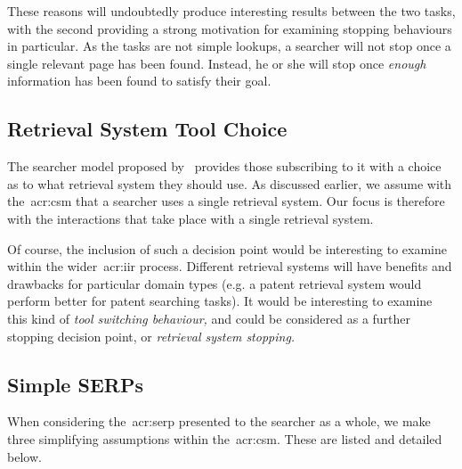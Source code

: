 These reasons will undoubtedly produce interesting results between the two tasks, with the second providing a strong motivation for examining stopping behaviours in particular. As the tasks are not simple lookups, a searcher will not stop once a single relevant page has been found. Instead, he or she will stop once \emph{enough}~\citep{zach2005enough_is_enough} information has been found to satisfy their goal.

\subsection{Retrieval System Tool Choice}\label{sec:csm:assumptions:tool}
The searcher model proposed by~\cite{thomas2014modelling_behaviour} provides those subscribing to it with a choice as to what retrieval system they should use. As discussed earlier, we assume with the~\gls{acr:csm} that a searcher uses a single retrieval system. Our focus is therefore with the interactions that take place with a single retrieval system.

Of course, the inclusion of such a decision point would be interesting to examine within the wider~\gls{acr:iir} process. Different retrieval systems will have benefits and drawbacks for particular domain types (e.g. a patent retrieval system would perform better for patent searching tasks). It would be interesting to examine this kind of \emph{tool switching behaviour,} and could be considered as a further stopping decision point, or \emph{retrieval system stopping.}

\subsection{Simple SERPs}
When considering the~\gls{acr:serp} presented to the searcher as a whole, we make three simplifying assumptions within the~\gls{acr:csm}. These are listed and detailed below.

